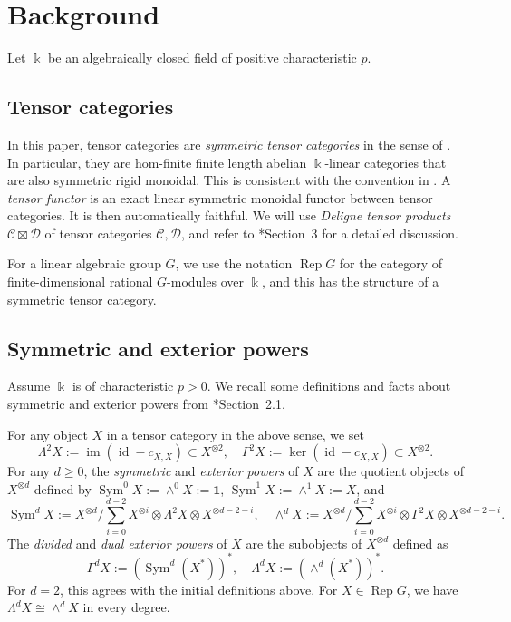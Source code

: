 \documentclass[11pt,oneside]{amsart}
\theoremstyle{definition}
\theoremstyle{remark}
\numberwithin{equation}{section}
\newcommand\cC{\mathcal C}
\newcommand\cD{\mathcal D}
\newcommand\Rep{\operatorname{Rep}}
\newcommand\im{\operatorname{im}}
\newcommand\Sym{\operatorname{Sym}}
\renewcommand\o\otimes
\renewcommand\:\colon
\newcommand\one{\mathbf{1}}
\newcommand\kk{\Bbbk}
\newcommand\id{\operatorname{id}}
\begin{document}
\section{Background}

Let $\kk$ be an algebraically closed field of positive characteristic $p$.

\subsection{Tensor categories} In this paper, tensor categories are \emph{symmetric tensor categories} in the sense of \cite{EGNO}. In particular, they are hom-finite finite length abelian $\kk$-linear categories that are also symmetric rigid monoidal. This is consistent with the convention in \cite{CEN}. A \emph{tensor functor} is an exact linear symmetric monoidal functor between tensor categories. It is then automatically faithful. We will use \emph{Deligne tensor products} $\cC\boxtimes\cD$ of tensor categories $\cC,\cD$, and refer to \cite{CF-frob}*{Section~3} for a detailed discussion.

For a linear algebraic group $G$, we use the notation $\Rep G$ for the category of finite-dimensional rational $G$-modules over $\kk$, and this has the structure of a symmetric tensor category.

\subsection{Symmetric and exterior powers} Assume $\kk$ is of characteristic $p>0$. We recall some definitions and facts about symmetric and exterior powers from \cite{CEN}*{Section~2.1}. 

For any object $X$ in a tensor category in the above sense, we set
$$
\Lambda^2 X := \im(\id-c_{X,X}) \subset X^{\o2} ,\quad
\Gamma^2 X := \ker(\id-c_{X,X}) \subset X^{\o2} .
$$
For any $d\ge0$, the \emph{symmetric} and \emph{exterior powers} of $X$ are the quotient objects of $X^{\o d}$ defined by $\Sym^0 X:=\wedge^0 X:=\one$, $\Sym^1 X:=\wedge^1 X:=X$, and
$$
\Sym^d X := X^{\o d} \Big/ \sum_{i=0}^{d-2} X^{\o i} \o \Lambda^2 X \o X^{\o d-2-i} ,\quad
\wedge^d X := X^{\o d} \Big/ \sum_{i=0}^{d-2} X^{\o i} \o \Gamma^2 X \o X^{\o d-2-i} .
$$
The \emph{divided} and \emph{dual exterior powers} of $X$ are the subobjects of $X^{\o d}$ defined as
$$
\Gamma^d X:=(\Sym^d(X^*))^* ,\quad
\Lambda^d X:=(\wedge^d(X^*))^* .
$$
For $d=2$, this agrees with the initial definitions above. For $X\in\Rep G$, we have $\Lambda^d X\cong\wedge^d X$ in every degree.
\end{document}
